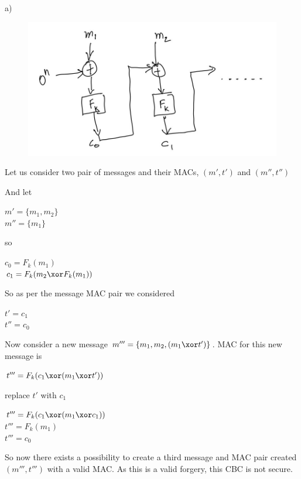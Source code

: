 a)
\begin{figure}[h]
    \includegraphics[width=\textwidth,height=\textheight,keepaspectratio]{7-3 IMG.jpg}
    \centering
\end{figure}


Let us consider two pair of messages and their MACs, $(m', t')$ and $(m'', t'')$

And let 
\begin{center}
    $m' = \{m_1, m_2 \}$ \\
    $m'' = \{m_1\}$ 
\end{center}

so

\begin{center}
    $c_0 = F_k(m_1)$\\
    $c_1 = F_k(m_2 \xor F_k(m_1))$
\end{center}

So as per the message MAC pair we considered 
\begin{center}
    $t' = c_1$\\
    $t''= c_0$
\end{center}

Now consider a new message $m''' = \{m_1, m_2, (m_1 \xor t')\}$. MAC for this new 
message is 
\begin{center}
    $t''' = F_k(c_1 \xor (m_1 \xor t'))$\\
\end{center}
    replace $t'$ with $c_1$\\
\begin{center}
    $t''' = F_k(c_1 \xor (m_1 \xor c_1))$ \\
    $t''' = F_k(m_1)$\\
    $t''' = c_0$
\end{center}

So now there exists a possibility to create a third message and MAC pair created
$(m''', t''')$ with a valid MAC. As this is a valid forgery, this CBC is not secure.\\



